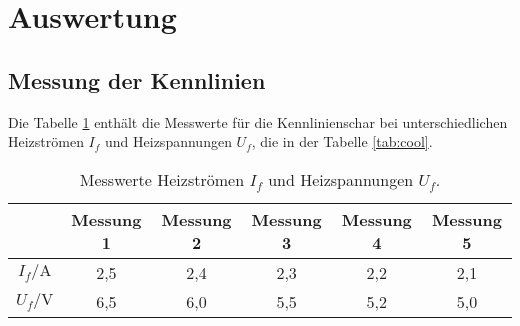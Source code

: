 \section{Auswertung}
\label{sec:Auswertung}
\subsection{Messung der Kennlinien}
Die Tabelle \ref{tab:1} enthält die Messwerte für die Kennlinienschar
bei unterschiedlichen Heizströmen $I_{f}$ und Heizspannungen $U_f$, die
in der Tabelle \ref{tab:cool}.
\begin{table}
  \centering
  \caption{Messwerte Heizströmen $I_{f}$ und Heizspannungen $U_f$.}
  \label{tab:1}
  \begin{tabular}{c | c c c c c}
  \toprule
   &  Messung 1 & Messung 2 & Messung 3 & Messung 4 & Messung 5\\ %
   \midrule
$I_f/\si{\ampere}$ & 2,5 & 2,4 & 2,3 & 2,2 & 2,1\\
$U_f/\si{\volt}$   & 6,5 & 6,0 & 5,5 & 5,2 & 5,0\\
\bottomrule
\end{tabular}
\end{table}
\FloatBarrier

%


